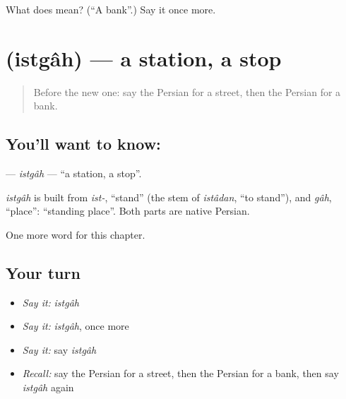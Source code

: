 \begin{tcolorbox}[breakable,colback=teal!4,colframe=teal!35!black,title={Before you move on}]
What does  mean? (\textquotedblleft{}A bank\textquotedblright{}.) Say it once more.
\end{tcolorbox}
\section[\texorpdfstring{\fa{ایستگاه} (istgâh)}{ایستگاه (istgâh)}]{ (istgâh) — a station, a stop}

\label{lesson:FA-C70-istgah}



\begin{quote}
Before the new one: say the Persian for a street, then the Persian for a bank.
\end{quote}

\subsection*{You'll want to know: }
\textbf{} — \emph{istgâh} — \textquotedblleft{}a station, a stop\textquotedblright{}.

\begin{cousinweb}
\emph{istgâh} is built from \emph{ist-}, \textquotedblleft{}stand\textquotedblright{} (the stem of \emph{istâdan}, \textquotedblleft{}to stand\textquotedblright{}), and \emph{gâh}, \textquotedblleft{}place\textquotedblright{}: \textquotedblleft{}standing place\textquotedblright{}. Both parts are native Persian.
\end{cousinweb}

\begin{grammarlens}[title={What you've built}]
One more word for this chapter.
\end{grammarlens}

\subsection*{Your turn}
\begin{itemize}
\raggedright
  \item \emph{Say it:} \emph{istgâh}
  \item \emph{Say it:} \emph{istgâh}, once more
  \item \emph{Say it:} say \emph{istgâh}
  \item \emph{Recall:} say the Persian for a street, then the Persian for a bank, then say \emph{istgâh} again
\end{itemize}

